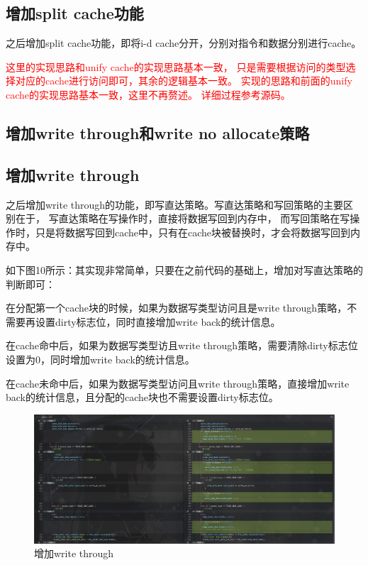 \documentclass[12pt,hyperref,a4paper,UTF8]{ctexart}
\begin{document}
\subsection{增加split cache功能}

之后增加split cache功能，即将i-d cache分开，分别对指令和数据分别进行cache。

\textcolor{red}{这里的实现思路和unify cache的实现思路基本一致，
只是需要根据访问的类型选择对应的cache进行访问即可，其余的逻辑基本一致。
实现的思路和前面的unify cache的实现思路基本一致，这里不再赘述。
详细过程参考源码。
}
\subsection{增加write through和write no allocate策略}
\subsection*{增加write through}

之后增加write through的功能，即写直达策略。写直达策略和写回策略的主要区别在于，
写直达策略在写操作时，直接将数据写回到内存中，
而写回策略在写操作时，只是将数据写回到cache中，只有在cache块被替换时，才会将数据写回到内存中。

如下图10所示：其实现非常简单，只要在之前代码的基础上，增加对写直达策略的判断即可：

在分配第一个cache块的时候，如果为数据写类型访问且是write through策略，不需要再设置dirty标志位，同时直接增加write back的统计信息。

在cache命中后，如果为数据写类型访且write through策略，需要清除dirty标志位设置为0，同时增加write back的统计信息。

在cache未命中后，如果为数据写类型访问且write through策略，直接增加write back的统计信息，且分配的cache块也不需要设置dirty标志位。

\begin{figure}[H]
    \centering
    \includegraphics[width=1\textwidth]{./figures/fig/image10.png}
    \caption{增加write through}
\end{figure}
\end{document}
